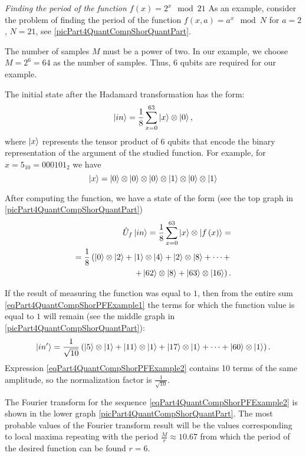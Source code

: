 \begin{example}
\emph{Finding the period of the function $f\left(x\right) = 2^x \mod 21$}
\label{exPart4QuantCompShorQuantPeriodFinding}
As an example, consider the problem of finding the period of the function $f\left(x, a\right) = a^x \mod{N}$ for $a=2$, $N = 21$, see \autoref{picPart4QuantCompShorQuantPart}.

The number of samples $M$ must be a power of two. In our example, we choose $M = 2^6 = 64$ as the number of samples. Thus, 6 qubits are required for our example.

The initial state after the Hadamard transformation has the form:
\begin{equation}
\ket{in} = \frac{1}{8}\sum_{x = 0}^{63}\ket{x} \otimes \ket{0},
\nonumber
\end{equation}
where $\ket{x}$ represents the tensor product  of 6 qubits that encode the binary representation of the argument of the studied function. For example, for $x=5_{10}=000101_2$ we have
\[
\ket{x} = \ket{0}\otimes \ket{0}\otimes \ket{0}\otimes \ket{1}\otimes \ket{0}\otimes \ket{1}
\]

After computing the function, we have a state of the form (see the top graph in \autoref{picPart4QuantCompShorQuantPart})
\begin{eqnarray}
\hat{U}_f\ket{in} = \frac{1}{8}\sum_{x = 0}^{63}\ket{x} \otimes \left|f\left(x\right)\right> = 
\nonumber \\
=
\frac{1}{8}
\left(
\ket{0}\otimes\ket{2} + 
\ket{1}\otimes\ket{4} + 
\ket{2}\otimes\ket{8} + \dots +
\right.
\nonumber \\
\left.
+
\ket{62}\otimes\ket{8} +
\ket{63}\otimes\ket{16}
\right).
\label{eqPart4QuantCompShorPFExample1}
\end{eqnarray}

If the result of measuring the function was equal to $1$, then from the entire sum \eqref{eqPart4QuantCompShorPFExample1} the terms for which the function value is equal to $1$ will remain (see the middle graph in \autoref{picPart4QuantCompShorQuantPart}):
\begin{equation}
\ket{in'} = \frac{1}{\sqrt{10}}\left( 
\ket{5}\otimes\ket{1} +
\ket{11}\otimes\ket{1} +
\ket{17}\otimes\ket{1} +
\dots +
\ket{60}\otimes\ket{1}
\right).
\label{eqPart4QuantCompShorPFExample2}
\end{equation} 
Expression \eqref{eqPart4QuantCompShorPFExample2} contains 10 terms of the same amplitude, so the normalization factor is $\frac{1}{\sqrt{10}}$.

The Fourier transform for the sequence \eqref{eqPart4QuantCompShorPFExample2} is shown in the lower graph \autoref{picPart4QuantCompShorQuantPart}. The most probable values of the Fourier transform result will be the values corresponding to local maxima repeating with the period $\frac{M}{r}\approx10.67$ from which the period of the desired function can be found $r=6$. 

\end{example}
